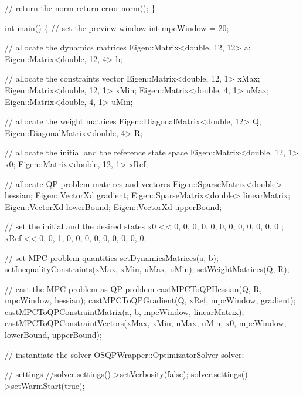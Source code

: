 \begin{DoxyCodeInclude}
    \textcolor{comment}{// return the norm}
    \textcolor{keywordflow}{return} error.norm();
\}


\textcolor{keywordtype}{int} main()
\{
    \textcolor{comment}{// set the preview window}
    \textcolor{keywordtype}{int} mpcWindow = 20;

    \textcolor{comment}{// allocate the dynamics matrices}
    Eigen::Matrix<double, 12, 12> a;
    Eigen::Matrix<double, 12, 4> b;

    \textcolor{comment}{// allocate the constraints vector}
    Eigen::Matrix<double, 12, 1> xMax;
    Eigen::Matrix<double, 12, 1> xMin;
    Eigen::Matrix<double, 4, 1> uMax;
    Eigen::Matrix<double, 4, 1> uMin;

    \textcolor{comment}{// allocate the weight matrices}
    Eigen::DiagonalMatrix<double, 12> Q;
    Eigen::DiagonalMatrix<double, 4> R;

    \textcolor{comment}{// allocate the initial and the reference state space}
    Eigen::Matrix<double, 12, 1> x0;
    Eigen::Matrix<double, 12, 1> xRef;

    \textcolor{comment}{// allocate QP problem matrices and vectores}
    Eigen::SparseMatrix<double> hessian;
    Eigen::VectorXd gradient;
    Eigen::SparseMatrix<double> linearMatrix;
    Eigen::VectorXd lowerBound;
    Eigen::VectorXd upperBound;

    \textcolor{comment}{// set the initial and the desired states}
    x0 << 0, 0, 0, 0, 0, 0, 0, 0, 0, 0, 0, 0 ;
    xRef <<  0, 0, 1, 0, 0, 0, 0, 0, 0, 0, 0, 0;

    \textcolor{comment}{// set MPC problem quantities}
    setDynamicsMatrices(a, b);
    setInequalityConstraints(xMax, xMin, uMax, uMin);
    setWeightMatrices(Q, R);

    \textcolor{comment}{// cast the MPC problem as QP problem}
    castMPCToQPHessian(Q, R, mpcWindow, hessian);
    castMPCToQPGradient(Q, xRef, mpcWindow, gradient);
    castMPCToQPConstraintMatrix(a, b, mpcWindow, linearMatrix);
    castMPCToQPConstraintVectors(xMax, xMin, uMax, uMin, x0, mpcWindow, lowerBound, upperBound);

    \textcolor{comment}{// instantiate the solver}
    OSQPWrapper::OptimizatorSolver solver;

    \textcolor{comment}{// settings}
    \textcolor{comment}{//solver.settings()->setVerbosity(false);}
    solver.settings()->setWarmStart(\textcolor{keyword}{true});


\end{DoxyCodeInclude}
